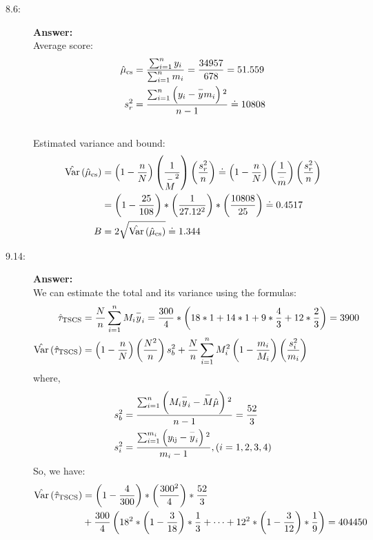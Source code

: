 \documentclass{article}
\begin{document}
\begin{description}
    \item[8.6:]{\bf Answer:}\\
    Average score:
    \begin{align} \notag
            \hat{\mu }_{\text{cs}}&=\frac{\sum _{i=1}^n y_i}{\sum _{i=1}^n m_i}=\frac{34957}{678}=51.559\\ \notag
            s_r^2&=\frac{\sum _{i=1}^n \left(y_i-\overset{-}{y}m_i\right){}^2}{n-1}\doteq 10808\\ \notag
    \end{align}
    Estimated variance and bound:
    \begin{align} \notag
            \hat{\text{Var}}\left(\hat{\mu}_{\text{cs}}\right)&=\left(1-\frac{n}{N}\right)\left(\frac{1}{\overset{-}{M}^2}\right)\left(\frac{s_r^2}{n}\right)\doteq \left(1-\frac{n}{N}\right)\left(\frac{1}{\overset{-}{m}}\right)\left(\frac{s_r^2}{n}\right)\\ \notag
            &=\left(1-\frac{25}{108}\right)*\left(\frac{1}{27.12^2}\right)*\left(\frac{10808}{25}\right)\doteq 0.4517\\ \notag
            B&=2\sqrt{\hat{\text{Var}}\left(\hat{\mu }_{\text{cs}}\right)}\doteq 1.344
    \end{align}
    \item[9.14:]{\bf Answer:}\\
    We can estimate the total and its variance using the formulas:
    \begin{align} \notag
      \hat{\tau }_{\text{TSCS}}&=\frac{N}{n}\sum _{i=1}^n M_i\overset{-}{y}_i=\frac{300}{4}*\left(18*1+14*1+9*\frac{4}{3}+12*\frac{2}{3}\right)=3900\\ \notag
      \hat{\text{Var}}\left(\hat{\tau }_{\text{TSCS}}\right)&=\left(1-\frac{n}{N}\right)\left(\frac{N^2}{n}\right)s_b^2+\frac{N}{n}\sum _{i=1}^n M_i^2\left(1-\frac{m_i}{M_i}\right)\left(\frac{s_i^2}{m_i}\right)
    \end{align}
    where,
    \begin{align} \notag
      s_b^2&=\frac{\sum _{i=1}^n \left(M_i\overset{-}{y}_i-\overset{-}{M}\hat{\mu }\right){}^2}{n-1}=\frac{52}{3}\\ \notag
      s_i^2&=\frac{\sum _{i=1}^{m_i} \left(y_{\text{ij}}-\overset{-}{y}_i\right){}^2}{m_i-1}, (i = 1, 2, 3, 4)
    \end{align}
    So, we have:
    \begin{align} \notag
     \hat{\text{Var}}\left(\hat{\tau }_{\text{TSCS}}\right)&=\left(1-\frac{4}{300}\right)*\left(\frac{300^2}{4}\right)*\frac{52}{3}\\ \notag&+\frac{300}{4}\left(18^2*\left(1-\frac{3}{18}\right)*\frac{1}{3}+\cdots +12^2*\left(1-\frac{3}{12}\right)*\frac{1}{9}\right)=404450 \\ \notag

\end{align}
\end{description}
\end{document}
